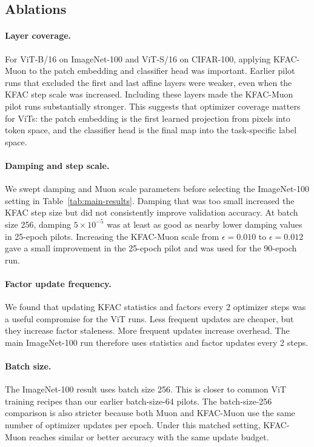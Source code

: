 \subsection{Ablations}
\label{sec:experiments-ablations}

\paragraph{Layer coverage.}
For ViT-B/16 on ImageNet-100 and ViT-S/16 on CIFAR-100, applying KFAC-Muon to the patch embedding and classifier head was important. Earlier pilot runs that excluded the first and last affine layers were weaker, even when the KFAC step scale was increased. Including these layers made the KFAC-Muon pilot runs substantially stronger. This suggests that optimizer coverage matters for ViTs: the patch embedding is the first learned projection from pixels into token space, and the classifier head is the final map into the task-specific label space.

\paragraph{Damping and step scale.}
We swept damping and Muon scale parameters before selecting the ImageNet-100 setting in Table~\ref{tab:main-results}. Damping that was too small increased the KFAC step size but did not consistently improve validation accuracy. At batch size 256, damping $5\times 10^{-5}$ was at least as good as nearby lower damping values in 25-epoch pilots. Increasing the KFAC-Muon scale from $\epsilon=0.010$ to $\epsilon=0.012$ gave a small improvement in the 25-epoch pilot and was used for the 90-epoch run.

\paragraph{Factor update frequency.}
We found that updating KFAC statistics and factors every 2 optimizer steps was a useful compromise for the ViT runs. Less frequent updates are cheaper, but they increase factor staleness. More frequent updates increase overhead. The main ImageNet-100 run therefore uses statistics and factor updates every 2 steps.

\paragraph{Batch size.}
The ImageNet-100 result uses batch size 256. This is closer to common ViT training recipes than our earlier batch-size-64 pilots. The batch-size-256 comparison is also stricter because both Muon and KFAC-Muon use the same number of optimizer updates per epoch. Under this matched setting, KFAC-Muon reaches similar or better accuracy with the same update budget.

